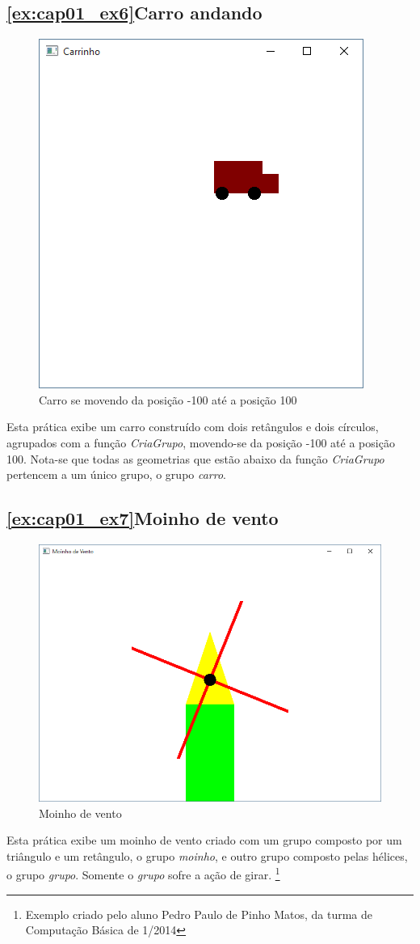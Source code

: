 \subsection{\ref{ex:cap01_ex6}Carro andando}
\begin{figure}[ht]
  \centerline{\includegraphics[width=.5\textwidth]{img/cap1_ex5.png}}
  \caption{Carro se movendo da posição -100 até a posição 100}
  \label{fig:cap01_ex6}
\end{figure}
Esta prática exibe um carro construído com dois retângulos e dois círculos, agrupados com a função \emph{CriaGrupo}, movendo-se da posição -100 até a posição 100. Nota-se que todas as geometrias que estão abaixo da função \emph{CriaGrupo} pertencem a um único grupo, o grupo \emph{carro}.


\subsection{\ref{ex:cap01_ex7}Moinho de vento}
\begin{figure}[ht]
  \centerline{\includegraphics[width=.5\textwidth]{img/cap1_ex7.png}}
  \caption{Moinho de vento}
  \label{fig:cap01_ex7}
\end{figure}
Esta prática exibe um moinho de vento criado com um grupo composto por um triângulo e um retângulo, o grupo \emph{moinho}, e outro grupo composto pelas hélices, o grupo \emph{grupo}. Somente o \emph{grupo} sofre a ação de girar. \footnote{Exemplo criado pelo aluno Pedro Paulo de Pinho Matos, da turma de Computação Básica de 1/2014}

